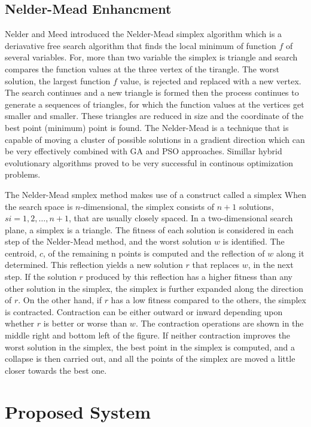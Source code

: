 \documentclass[a4paper,twoside]{article}
\begin{document}
 \subsection{Nelder-Mead Enhancment}

Nelder and Meed introduced the Nelder-Mead simplex algorithm which is a deriavative free  search algorithm that finds the local minimum of  function $f$ of several variables. For, more than two variable the simplex is triangle and search compares  the function values at the three vertex of the tirangle. The worst solution, the largest function $f$ value, is rejected and replaced with a new vertex. The search continues and a new triangle is formed then the process continues to generate a sequences of triangles, for which the function values at the vertices get smaller and smaller. These triangles are reduced in size and the coordinate of the best point (minimum) point is found.  The Nelder-Mead is a technique that is capable of moving a cluster of possible solutions in a gradient direction which can be very effectively combined with GA and PSO approaches. Simillar hybrid evolutionary algorithms proved to be very successful in continous optimization problems.


The Nelder-Mead smplex method makes use of a construct called a simplex When the search space is $n$-dimensional, the simplex consists of $n+1$ solutions, $s i = {1,2,\dots  , n+1}$, that are usually closely spaced. In a two-dimensional search plane, a simplex is a triangle. The fitness of each solution is considered in each step of the Nelder-Mead method, and the worst solution $w$ is identified. The centroid, $c$, of the remaining n points is computed and the reflection of $w$ along it determined. This reflection yields a new solution $r$ that replaces $w$, in the next step. If the solution $r$ produced by this reflection has a higher fitness than any other solution in the simplex, the simplex is further expanded along the direction of $r$. On the other hand, if $r$ has a low fitness compared to the others, the simplex is contracted. Contraction can be either outward or inward depending upon whether $r$ is better or worse than $w$. The contraction operations are shown in the middle right and bottom left of the figure. If neither contraction improves the worst solution in the simplex, the best point in the simplex is computed, and a collapse is then carried out, and all the points of the simplex are moved a little closer towards the best one.

\section{Proposed System}
\label{sec:proposed}
\end{document}
